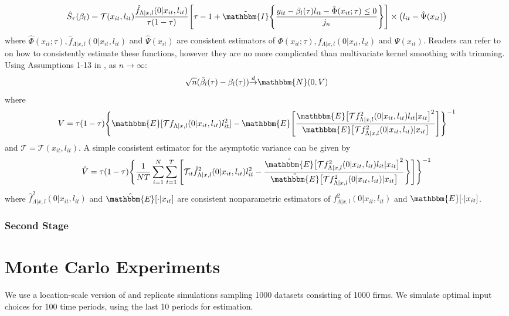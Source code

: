 \documentclass[11pt]{article}
\begin{document}
\begin{equation}
\hat{S}_{\tau}(\beta_{l})=\mathcal{T}(x_{it}, l_{it})\frac{\hat{f}_{\Lambda|x,l}(0|x_{it},l_{it})}{\tau(1-\tau)}\Bigg[\tau-1+\tilde{\mathbbm{I}}\Bigg\{\frac{y_{it}-\beta_{l}(\tau)l_{it}-\hat{\Phi}(x_{it}; \tau)\leq0}{j_{n}}\Bigg\}\Bigg]\times\big(l_{it}-\hat{\Psi}(x_{it})\big)
\end{equation}
where $\hat{\Phi}(x_{it}; \tau), \hat{f}_{\Lambda|x,l}(0|x_{it},l_{it})$ and $\hat{\Psi}(x_{it})$ are consistent estimators of $\Phi(x_{it}; \tau), f_{\Lambda|x,l}(0|x_{it},l_{it})$ and $\Psi(x_{it})$. Readers can refer to \cite{Lee2003} on how to consistently estimate these functions, however they are no more complicated than multivariate kernel smoothing with trimming. Using Assumptions 1-13 in \cite{Lee2003}, as $n\rightarrow \infty$:
\begin{equation*}
\sqrt{n}(\bar{\beta}_{l}(\tau)-\beta_{l}(\tau))\overset{d}{\operatorname{\rightarrow}}\mathbbm{N}(0,V)\\
\end{equation*}
where
\begin{equation}
V=\tau(1-\tau)\Bigg\{\mathbbm{E}[\mathcal{T}f_{\Lambda|x,l}(0|x_{it},l_{it})l^{2}_{it}]-\mathbbm{E}\Bigg[\frac{\mathbbm{E}\big[\mathcal{T}f^{2}_{\Lambda|x,l}(0|x_{it},l_{it})l_{it}|x_{it}\big]^{2}}{\mathbbm{E}\big[\mathcal{T}f^{2}_{\Lambda|x,l}(0|x_{it},l_{it})|x_{it}\big]}\Bigg]\Bigg\}^{-1}
\end{equation}
and $\mathcal{T}=\mathcal{T}(x_{it}, l_{it})$. A simple consistent estimator for the asymptotic variance can be given by
\begin{equation}
\hat{V}=\tau(1-\tau)\Bigg\{\frac{1}{NT}\sum_{i=1}^{N}\sum_{t=1}^{T}\Bigg[\mathcal{T}_{it}\hat{f}_{\Lambda|x,l}^{2}(0|x_{it},l_{it})l_{it}^{2}-\frac{\hat{\mathbbm{E}}\big[\mathcal{T}f^{2}_{\Lambda|x,l}(0|x_{it},l_{it})l_{it}|x_{it}\big]^{2}}{\hat{\mathbbm{E}}\big[\mathcal{T}f^{2}_{\Lambda|x,l}(0|x_{it},l_{it})|x_{it}\big]}\Bigg\}\Bigg]\Bigg\}^{-1}
\end{equation}
where $\hat{f}_{\Lambda|x,l}^{2}(0|x_{it},l_{it})$ and $\hat{\mathbbm{E}}[\cdot|x_{it}]$ are consistent nonparametric estimators of $f_{\Lambda|x,l}^{2}(0|x_{it},l_{it})$ and $\mathbbm{E}[\cdot|x_{it}]$. 


\subsubsection*{Second Stage}

\newpage
\section{Monte Carlo Experiments} \label{montecarlo}
We use a location-scale version of \cite{Levinsohn2003} and replicate \cite{Ackerberg2015} simulations sampling 1000 datasets consisting of 1000 firms. We simulate optimal input choices for 100 time periods, using the last 10 periods for estimation. 
\end{document}
